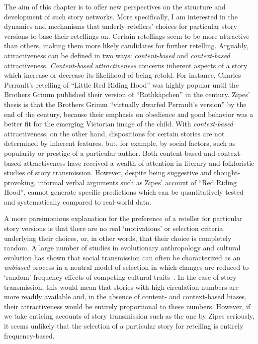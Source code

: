 The aim of this chapter is to offer new perspectives on the structure and development of such story networks. More specifically, I am interested in the dynamics and mechanisms that underly retellers' choices for particular story versions to base their retellings on. Certain retellings seem to be more attractive than others, making them more likely candidates for further retelling. Arguably, attractiveness can be defined in two ways: \emph{content-based} and \emph{context-based} attractiveness.\autocite[These types resemble the concepts of content-based and context-based biases in theoretical models of cultural evolution. Cf.][]{henrich:2003} \emph{Content-based attractiveness} concerns inherent aspects of a story which increase or decrease its likelihood of being retold. For instance, Charles Perrault's retelling of ``Little Red Riding Hood'' was highly popular until the Brothers Grimm published their version of ``Rothkäpchen'' in the  century. Zipes' thesis is that the Brothers Grimm ``virtually dwarfed Perrault's version'' by the end of the  century, because their emphasis on obedience and good behavior was a better fit for the emerging Victorian image of the child\autocite{zipes:1993}. With \emph{context-based} attractiveness, on the other hand, dispositions for certain stories are not determined by inherent features, but, for example, by social factors, such as popularity or prestige of a particular author. Both content-based and context-based attractiveness have received a wealth of attention in literary and folkloristic studies of story transmission\autocite{geerts:2014}. However, despite being suggestive and thought-provoking, informal verbal arguments such as Zipes' account of ``Red Riding Hood'', cannot generate specific predictions which can be quantitatively tested and systematically compared to real-world data. 

A more parsimonious explanation for the preference of a reteller for particular story versions is that there are no real `motivations' or selection criteria underlying their choices, or, in other words, that their choice is completely random. A large number of studies in evolutionary anthropology and cultural evolution has shown that social transmission can often be characterized as an \emph{unbiased} process in a neutral model of selection in which changes are reduced to `random' frequency effects of competing cultural traits~\autocite{Bentley:2004,Mesoudi:2009,bentley:2011}. In the case of story transmission, this would mean that stories with high circulation numbers are more readily available and, in the absence of content- and context-based biases, their attractiveness would be entirely proportional to these numbers. However, if we take enticing accounts of story transmission such as the one by Zipes seriously, it seems unlikely that the selection of a particular story for retelling is entirely frequency-based.


